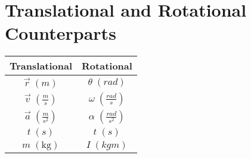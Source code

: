 \documentclass{article}
\begin{document}
\section{Translational and Rotational Counterparts}\label{Appendix B}

\begin{center}
\begin{tabular}{|c | c |}
    \hline
    Translational & Rotational \\
    \hline \hline
    $\vec{r} \; (m)$ & $\theta \; (rad)$ \\
    $\vec{v} \; (\frac{m}{s}) $ & $\omega \; (\frac{rad}{s})$ \\
    $\vec{a} \; (\frac{m}{s^2})$ & $\alpha \; (\frac{rad}{s^2})$ \\
    $t \; (s)$ & $t \; (s)$ \\
    \hline \hline
    $m \; (\mathrm{kg})$ & $I \; (kgm)$\\
    \hline
\end{tabular}
\end{center}
\end{document}
